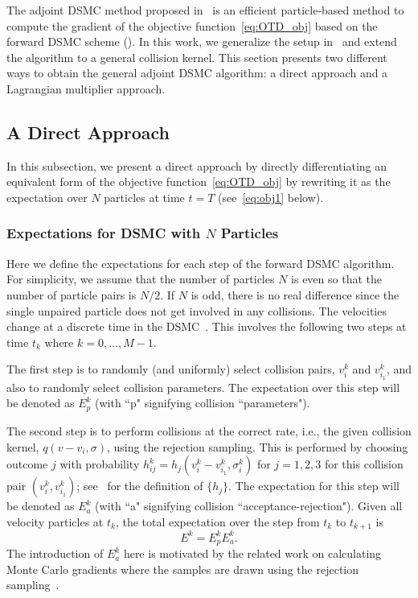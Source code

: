 \documentclass[12pt,nopreprintline]{elsarticle}
\begin{document}
The adjoint DSMC method proposed in~\cite{caflisch2021adjoint} is an efficient particle-based method to compute the gradient of the objective function~\eqref{eq:OTD_obj} based on the forward DSMC scheme (). In this work, we generalize the setup in~\cite{caflisch2021adjoint} and extend the algorithm to a general collision kernel. This section presents two different ways to obtain the general adjoint DSMC algorithm: a direct approach and a Lagrangian multiplier approach.



\subsection{A Direct Approach} \label{subsec:direct}
In this subsection, we present a direct approach by directly differentiating an equivalent form of the objective function~\eqref{eq:OTD_obj} by rewriting it as the expectation over $N$ particles at time $t=T$ (see~\cref{eq:obj1} below).

\subsubsection{Expectations for DSMC with $N$ Particles}\label{section:Expectations}
Here we define the expectations for each step of the forward DSMC algorithm. For simplicity, we assume that the number of particles $N$ is even so that the number of particle pairs is $N/2$. If $N$ is odd, there is no real difference since the single unpaired particle does not get involved in any collisions. 
The velocities change at a discrete time in the DSMC~. This involves the following two steps at time $t_k$ where $k=0,\ldots,M-1$.


The first step is to randomly (and uniformly) select collision pairs, $v_i^k$ and $v_{i_1}^k$, and also to randomly select collision parameters.
The expectation over this step will be denoted as $E_p^k$ (with ``p" signifying collision ``parameters"). 

The second step is to perform collisions at the correct rate, i.e., the given collision kernel, $q(v -v_i, \sigma)$, using the rejection sampling. This is performed by choosing outcome $j$ with probability $h^k_{ij}=h_j (v^k_i -v^k_{i_1}, \sigma_i^k)$ for $j=1,2,3$ for this collision pair $(v_i^k, v_{i_1}^k)$; see~ for the definition of $\{h_j\}$. The expectation for this step will be denoted as $E_a^k$ (with ``a" signifying collision ``acceptance-rejection"). Given all velocity particles at $t_k$, the total expectation over the step from $t_k$ to $t_{k+1}$ is
\begin{equation*}%
E^k = E_p^k E_a^k  .
\end{equation*}
The introduction of $E_a^k$ here is motivated by the related work on calculating Monte Carlo gradients where the samples are drawn using the rejection sampling~\cite{Blei2017,mohamed2019monte}.
\end{document}
